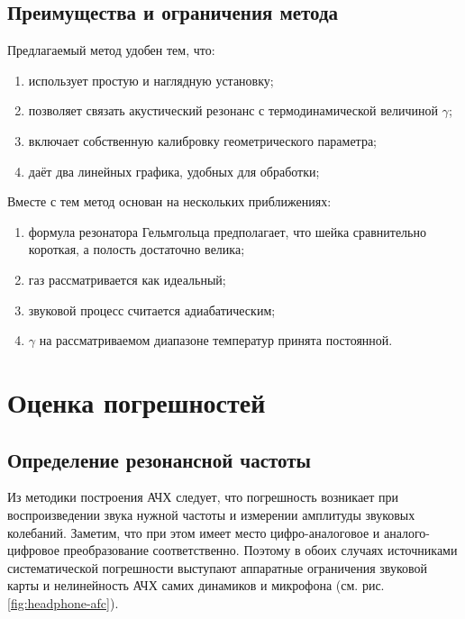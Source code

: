 \documentclass[12pt]{extreport}
\begin{document}
	
	
	
	
	\section{Преимущества и ограничения метода}
	
	
	\hspace{4mm} Предлагаемый метод удобен тем, что:
	\begin{enumerate}
		\item использует простую и наглядную установку;
		\item позволяет связать акустический резонанс с термодинамической величиной \(\gamma\);
		\item включает собственную калибровку геометрического параметра;
		\item даёт два линейных графика, удобных для обработки;
		
	\end{enumerate}
	
	
	Вместе с тем метод основан на нескольких приближениях:
	\begin{enumerate}
		\item формула резонатора Гельмгольца предполагает, что шейка сравнительно короткая, а полость достаточно велика;
		\item газ рассматривается как идеальный;
		\item звуковой процесс считается адиабатическим;
		\item \(\gamma\) на рассматриваемом диапазоне температур принята постоянной.

	\end{enumerate}
	
	
	
	\chapter{Оценка погрешностей}
	
	\section{Определение резонансной частоты}
	
	\hspace{4mm} Из методики построения АЧХ следует, что погрешность возникает при воспроизведении звука нужной частоты и измерении амплитуды звуковых колебаний. Заметим, что при этом имеет место цифро-аналоговое и аналого-цифровое преобразование соответственно. Поэтому в обоих случаях источниками систематической погрешности выступают аппаратные ограничения звуковой карты и нелинейность АЧХ самих динамиков и микрофона (см. рис. \ref{fig:headphone-afc}).
	
\end{document}
